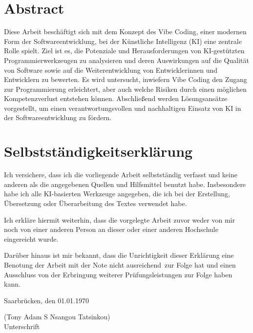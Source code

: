 \documentclass[paper=a4,fontsize=12pt,ngerman]{scrartcl}
\begin{document}
\pagestyle{plain}



\section*{Abstract}
Diese Arbeit beschäftigt sich mit dem Konzept des Vibe Coding, einer modernen Form der Softwareentwicklung, bei der Künstliche Intelligenz (KI) eine zentrale Rolle spielt. Ziel ist es, die Potenziale und Herausforderungen von KI-gestützten Programmierwerkzeugen zu analysieren und deren Auswirkungen auf die Qualität von Software sowie auf die Weiterentwicklung von Entwicklerinnen und Entwicklern zu bewerten. Es wird untersucht, inwiefern Vibe Coding den Zugang zur Programmierung erleichtert, aber auch welche Risiken durch einen möglichen Kompetenzverlust entstehen können. Abschließend werden Lösungsansätze vorgestellt, um einen verantwortungsvollen und nachhaltigen Einsatz von KI in der Softwareentwicklung zu fördern.


\newpage
\section*{Selbstständigkeitserklärung}
Ich versichere, dass ich die vorliegende Arbeit selbstständig verfasst und 
keine anderen als die angegebenen Quellen und Hilfsmittel benutzt habe.
Insbesondere habe ich alle KI-basierten Werkzeuge angegeben, die ich bei
der Erstellung, Übersetzung oder Überarbeitung des Textes verwendet habe.

Ich erkläre hiermit weiterhin, dass die vorgelegte Arbeit zuvor weder von mir 
noch von einer anderen Person an dieser oder einer anderen Hochschule 
eingereicht wurde.

Darüber hinaus ist mir bekannt, dass die Unrichtigkeit dieser Erklärung eine 
Benotung der Arbeit mit der Note \glqq nicht ausreichend\grqq \ zur Folge hat 
und einen Ausschluss von der Erbringung weiterer Prüfungsleistungen zur Folge 
haben kann.
\bigskip
 
Saarbrücken, den 01.01.1970

\smallskip
\vspace{1cm}
\noindent
(Tony Adam S Nsangou Tatsinkou)\\
Unterschrift

\clearpage
\tableofcontents
\thispagestyle{plain}
\newpage

\newpage
\clearpage
\end{document}
